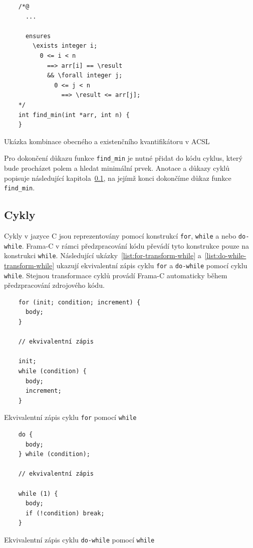 \begin{listing}[H]
    \begin{verbatim}
    /*@
      ...

      ensures
        \exists integer i;
          0 <= i < n
            ==> arr[i] == \result
            && \forall integer j;
              0 <= j < n
                ==> \result <= arr[j];
    */
    int find_min(int *arr, int n) {
    }
    \end{verbatim}
    \caption{Ukázka kombinace obecného a existenčního kvantifikátoru v ACSL}
    \label{list:acsl-exists-forall}
\end{listing}

Pro dokončení důkazu funkce \texttt{find\_min} je nutné přidat do kódu cyklus,
který bude procházet polem a hledat minimální prvek.
Anotace a důkazy cyklů popisuje následující kapitola~\ref{subsec:acsl-cykly},
na jejímž konci dokončíme důkaz funkce \texttt{find\_min}.

\subsection{Cykly}
\label{subsec:acsl-cykly}

Cykly v jazyce C jsou reprezentovány pomocí konstrukcí \texttt{for}, \texttt{while} a nebo \texttt{do-while}.
Frama\mbox{-}C v rámci předzpracování kódu převádí tyto konstrukce pouze na konstrukci \texttt{while}.
Následující ukázky~\ref{list:for-transform-while} a~\ref{list:do-while-transform-while}
ukazují ekvivalentní zápis cyklu \texttt{for} a \texttt{do-while} pomocí cyklu \texttt{while}.
Stejnou transformace cyklů provádí Frama\mbox{-}C automaticky během předzpracování zdrojového kódu.

\begin{listing}[H]
    \begin{verbatim}
    for (init; condition; increment) {
      body;
    }

    // ekvivalentní zápis

    init;
    while (condition) {
      body;
      increment;
    }
    \end{verbatim}
    \caption{Ekvivalentní zápis cyklu \texttt{for} pomocí \texttt{while}}
    \label{list:for-transform-while}
\end{listing}

\begin{listing}[H]
    \begin{verbatim}
    do {
      body;
    } while (condition);

    // ekvivalentní zápis

    while (1) {
      body;
      if (!condition) break;
    }
    \end{verbatim}
    \caption{Ekvivalentní zápis cyklu \texttt{do-while} pomocí \texttt{while}}
    \label{list:do-while-transform-while}
\end{listing}

